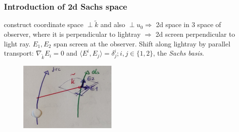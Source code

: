 \subsubsection{Introduction of 2d Sachs space}
construct coordinate space $\perp \tilde{k}$ and also $\perp u_0 \Rightarrow$ 2d space in 3 space of observer, where it is perpendicular to lightray $\Rightarrow$ 2d screen perpendicular to light ray. $E_1,E_2$ span screen at the observer. Shift along lightray by parallel transport: $\nabla_{\tilde{k}}E_i=0$ and $\langle E^i,E_j \rangle = \delta^i_j; i,j \in \{1,2\}$, the \emph{Sachs basis}.\\
\begin{figure}
	\centering
	\includegraphics[width=0.7\linewidth]{gfx/gravlensingSachsbasis}
	\caption{}
	\label{fig:gravlensingsachsbasis}
\end{figure}

